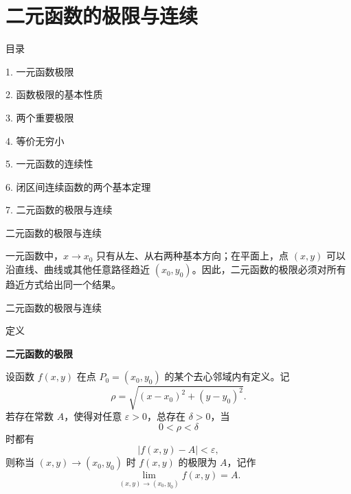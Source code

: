 \documentclass[aspectratio=169,10pt,fontset=fandol]{ctexbeamer}
\begin{document}
\section{二元函数的极限与连续}
\begin{frame}[t,fragile]{目录}
\normalsize
{\color{black}\normalsize 1. 一元函数极限\par}\vspace{0.3em}
{\color{black}\normalsize 2. 函数极限的基本性质\par}\vspace{0.3em}
{\color{black}\normalsize 3. 两个重要极限\par}\vspace{0.3em}
{\color{black}\normalsize 4. 等价无穷小\par}\vspace{0.3em}
{\color{black}\normalsize 5. 一元函数的连续性\par}\vspace{0.3em}
{\color{black}\normalsize 6. 闭区间连续函数的两个基本定理\par}\vspace{0.3em}
{\color{blue}\normalsize 7. 二元函数的极限与连续\par}\vspace{0.3em}
\end{frame}
\begin{frame}[t,fragile]{二元函数的极限与连续}
\footnotesize
{\footnotesize
一元函数中，\(x\to x_0\) 只有从左、从右两种基本方向；在平面上，点 \((x,y)\) 可以沿直线、曲线或其他任意路径趋近 \((x_0,y_0)\)。因此，二元函数的极限必须对所有趋近方式给出同一个结果。


}
\end{frame}
\begin{frame}[t,fragile]{二元函数的极限与连续}
\footnotesize
\begin{block}{定义}
{\footnotesize
\textbf{二元函数的极限}\par

	设函数 \(f(x,y)\) 在点 \(P_0=(x_0,y_0)\) 的某个去心邻域内有定义。记
	\[
	\rho=\sqrt{(x-x_0)^2+(y-y_0)^2}.
	\]
	若存在常数 \(A\)，使得对任意 \(\varepsilon>0\)，总存在 \(\delta>0\)，当
	\[
	0<\rho<\delta
	\]
	时都有
	\[
	|f(x,y)-A|<\varepsilon,
	\]
	则称当 \((x,y)\to(x_0,y_0)\) 时 \(f(x,y)\) 的极限为 \(A\)，记作
	\[
	\lim_{(x,y)\to(x_0,y_0)}f(x,y)=A.
	\]

}
\end{block}
\end{frame}
\end{document}
